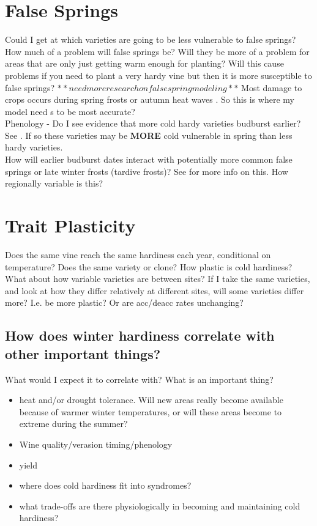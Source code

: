 \documentclass[11pt,letter]{article}
\begin{document}
\section{False Springs} 
Could I get at which varieties are going to be less vulnerable to false springs? \\

How much of a problem will false springs be? Will they be more of a problem for areas that are only just getting warm enough for planting? Will this cause problems if you need to plant a very hardy vine but then it is more susceptible to false springs? $**need more research on false spring modeling**$
Most damage to crops occurs during spring frosts or autumn heat waves \citep{Charrier2013}. So this is where my model need s to be most accurate? \\

Phenology - Do I see evidence that more cold hardy varieties budburst earlier? See \cite{Ferguson2014}. If so these varieties may be \textbf{MORE} cold vulnerable in spring than less hardy varieties. \\ 

How will earlier budburst dates interact with potentially more common false springs or late winter frosts (tardive frosts)? See \cite{Sgubin2018} for more info on this. How regionally variable is this?\\

\section{Trait Plasticity} 
Does the same vine reach the same hardiness each year, conditional on temperature? Does the same variety or clone? How plastic is cold hardiness? \\

What about how variable varieties are between sites? If I take the same varieties, and look at how they differ relatively at different sites, will some varieties differ more? I.e. be more plastic? Or are acc/deacc rates unchanging?\\


\subsection{How does winter hardiness correlate with other important things?}
What would I expect it to correlate with? What is an important thing?
\begin{itemize}
\item heat and/or drought tolerance. Will new areas really become available because of warmer winter temperatures, or will these areas become to extreme during the summer?
\item Wine quality/verasion timing/phenology
\item yield
\item where does cold hardiness fit into syndromes?
\item what trade-offs are there physiologically in becoming and maintaining cold hardiness?  
\end{itemize}
\end{document}
